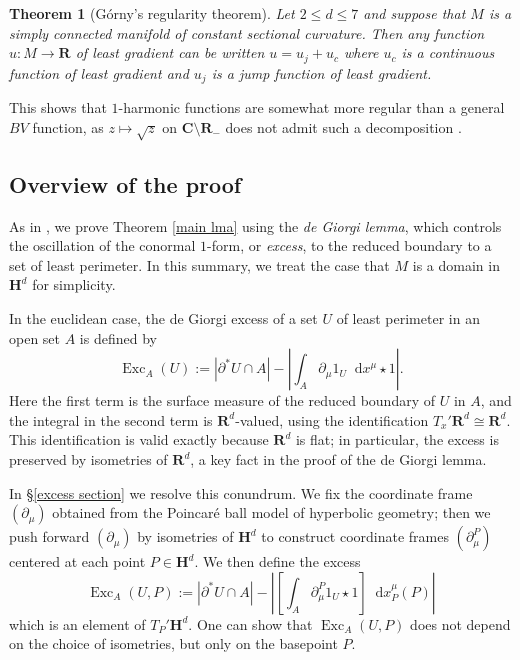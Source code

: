 \documentclass[reqno,11pt]{amsart}
\newcommand{\RR}{\mathbf{R}}
\newcommand{\CC}{\mathbf{C}}
\newcommand{\Hyp}{\mathbf H}
\DeclareMathOperator{\Exc}{Exc}
\newcommand*\dif{\mathop{}\!\mathrm{d}}
\newcommand{\dfn}[1]{\emph{#1}\index{#1}}
\newtheorem{theorem}{Theorem}[section]
\theoremstyle{definition}
\numberwithin{equation}{section}
\begin{document}
\begin{theorem}[G\'orny's regularity theorem]
Let $2 \leq d \leq 7$ and suppose that $M$ is a simply connected manifold of constant sectional curvature.
Then any function $u: M \to \RR$ of least gradient can be written $u = u_j + u_c$ where $u_c$ is a continuous function of least gradient and $u_j$ is a jump function of least gradient.
\end{theorem}

This shows that $1$-harmonic functions are somewhat more regular than a general $BV$ function, as $z \mapsto \sqrt z$ on $\CC \setminus \RR_-$ does not admit such a decomposition \cite[Example 4.1]{Ambrosio2000FunctionsOB}.


\subsection{Overview of the proof}
As in \cite{Miranda66, Giusti77}, we prove Theorem \ref{main lma} using the \dfn{de Giorgi lemma}, which controls the oscillation of the conormal $1$-form, or \dfn{excess}, to the reduced boundary to a set of least perimeter.
In this summary, we treat the case that $M$ is a domain in $\Hyp^d$ for simplicity.

In the euclidean case, the de Giorgi excess of a set $U$ of least perimeter in an open set $A$ is defined by
$$\Exc_A(U) := |\partial^* U \cap A| - \left|\int_A \partial_\mu 1_U \dif x^\mu \star 1\right|.$$
Here the first term is the surface measure of the reduced boundary of $U$ in $A$, and the integral in the second term is $\RR^d$-valued, using the identification $T_x'\RR^d \cong \RR^d$.
This identification is valid exactly because $\RR^d$ is flat; in particular, the excess is preserved by isometries of $\RR^d$, a key fact in the proof of the de Giorgi lemma.

In \S\ref{excess section} we resolve this conundrum.
We fix the coordinate frame $(\partial_\mu)$ obtained from the Poincar\'e ball model of hyperbolic geometry; then we push forward $(\partial_\mu)$ by isometries of $\Hyp^d$ to construct coordinate frames $(\partial_\mu^P)$ centered at each point $P \in \Hyp^d$.
We then define the excess
\begin{equation}\label{excess definition prelim}
\Exc_A(U, P) := |\partial^* U \cap A| - \left|\left[\int_A \partial_\mu^P 1_U \star 1\right] \dif x^\mu_P(P)\right|
\end{equation}
which is an element of $T_P' \Hyp^d$.
One can show that $\Exc_A(U, P)$ does not depend on the choice of isometries, but only on the basepoint $P$.
\end{document}
